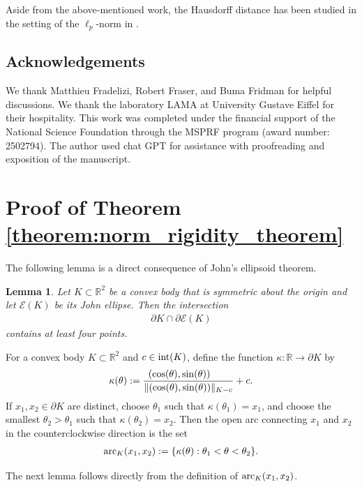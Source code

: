 \documentclass[11pt]{article}
\newtheorem{lemma}{Lemma}[section]
\begin{document}
Aside from the above-mentioned work, the Hausdorff distance has been studied in the setting of the $\ell_p$-norm in \cite{M-2026}.

\subsection{Acknowledgements} We thank Matthieu Fradelizi, Robert Fraser, and Buma Fridman for helpful discussions. We thank the laboratory LAMA at University Gustave Eiffel for their hospitality. This work was completed under the financial support of the National Science Foundation through the MSPRF program (award number: 2502794). The author used chat GPT for assistance with proofreading and exposition of the manuscript.

\section{Proof of Theorem \ref{theorem:norm_rigidity_theorem}}

The following lemma is a direct consequence of John's ellipsoid theorem. 

\begin{lemma}\label{lemma:boundary_four_points}
    Let $K\subset\mathbb{R}^2$ be a convex body that is symmetric about the origin and let $\mathcal{E}(K)$ be its John ellipse. Then the intersection
    \begin{align*}
        \partial K\cap \partial \mathcal{E}(K)
    \end{align*}
    contains at least four points.
\end{lemma}

For a convex body $K\subset\mathbb{R}^2$ and $c\in \textup{int}(K)$, define the function $\kappa:\mathbb{R}\rightarrow\partial K$ by
\begin{align*}
    \kappa(\theta):=\frac{\hspace{-0.65cm}(\cos(\theta),\sin(\theta))}{\|(\cos(\theta),\sin(\theta))\|_{K-c}}+c.
\end{align*}
If $x_1,x_2\in \partial K$ are distinct, choose $\theta_1$ such that $\kappa(\theta_1)=x_1$, and choose the smallest $\theta_2>\theta_1$ such that $\kappa(\theta_2)=x_2$. Then the open arc connecting $x_1$ and $x_2$ in the counterclockwise direction is the set
\begin{align*}
    \textup{arc}_K(x_1,x_2):=\{\kappa(\theta):\theta_1< \theta< \theta_2\}.
\end{align*}

The next lemma follows directly from the definition of $\textup{arc}_K(x_1,x_2)$.
\end{document}
